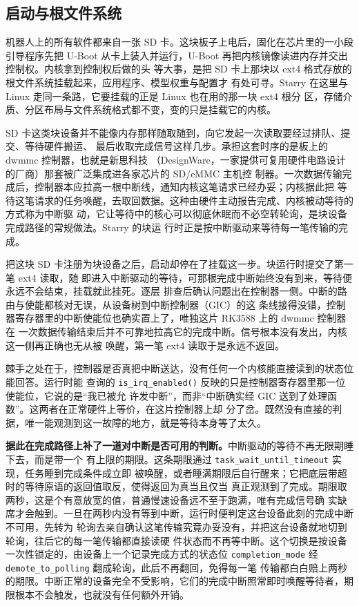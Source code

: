 \subsection{启动与根文件系统}\label{sec:boot}

机器人上的所有软件都来自一张 SD 卡。这块板子上电后，固化在芯片里的一小段引导程序先把
U-Boot 从卡上装入并运行，U-Boot 再把内核镜像读进内存并交出控制权。内核拿到控制权后做的头
等大事，是把 SD 卡上那块以 ext4 格式存放的根文件系统挂载起来，应用程序、模型权重与配置才
有处可寻。Starry 在这里与 Linux 走同一条路，它要挂载的正是 Linux 也在用的那一块 ext4 根分
区，存储介质、分区布局与文件系统格式都不变，变的只是挂载它的内核。

SD 卡这类块设备并不能像内存那样随取随到，向它发起一次读取要经过排队、提交、等待硬件搬运、
最后收取完成信号这样几步。承担这套时序的是板上的 dwmmc 控制器，也就是新思科技
（DesignWare，一家提供可复用硬件电路设计的厂商）那套被广泛集成进各家芯片的 SD/eMMC 主机控
制器。一次数据传输完成后，控制器本应拉高一根中断线，通知内核这笔请求已经办妥；内核据此把
等待这笔请求的任务唤醒，去取回数据。这种由硬件主动报告完成、内核被动等待的方式称为中断驱
动，它让等待中的核心可以彻底休眠而不必空转轮询，是块设备完成路径的常规做法。Starry 的块运
行时正是按中断驱动来等待每一笔传输的完成。

把这块 SD 卡注册为块设备之后，启动却停在了挂载这一步。块运行时提交了第一笔 ext4 读取，随
即进入中断驱动的等待，可那根完成中断始终没有到来，等待便永远不会结束，挂载就此挂死。逐层
排查后确认问题出在控制器一侧。中断的路由与使能都核对无误，从设备树到中断控制器（GIC）的这
条线接得没错，控制器寄存器里的中断使能位也确实置上了，唯独这片 RK3588 上的 dwmmc 控制器在
一次数据传输结束后并不可靠地拉高它的完成中断。信号根本没有发出，内核这一侧再正确也无从被
唤醒，第一笔 ext4 读取于是永远不返回。

棘手之处在于，控制器是否真把中断送达，没有任何一个内核能直接读到的状态位能回答。运行时能
查询的 \texttt{is\_irq\_enabled()} 反映的只是控制器寄存器里那一位使能位，它说的是“我已被允
许发中断”，而非“中断确实经 GIC 送到了处理函数”。这两者在正常硬件上等价，在这片控制器上却
分了岔。既然没有直接的判据，唯一能观测到这一故障的地方，就是等待本身等了太久。

\textbf{据此在完成路径上补了一道对中断是否可用的判断。}中断驱动的等待不再无限期睡下去，而是带一个
有上限的期限。这条期限通过 \texttt{task\_wait\_until\_timeout} 实现，任务睡到完成条件成立即
被唤醒，或者睡满期限后自行醒来；它把底层带超时的等待原语的返回值取反，使得返回为真当且仅当
真正观测到了完成。期限取两秒，这是个有意放宽的值，普通慢速设备远不至于跑满，唯有完成信号确
实缺席才会触到。一旦在两秒内没有等到中断，运行时便判定这台设备此刻的完成中断不可用，先转为
轮询去亲自确认这笔传输究竟办妥没有，并把这台设备就地切到轮询，往后它的每一笔传输都直接读硬
件状态而不再等中断。这个切换是按设备一次性锁定的，由设备上一个记录完成方式的状态位
\texttt{completion\_mode} 经 \texttt{demote\_to\_polling} 翻成轮询，此后不再翻回，免得每一笔
传输都白白赔上两秒的期限。中断正常的设备完全不受影响，它们的完成中断照常即时唤醒等待者，期
限根本不会触发，也就没有任何额外开销。

